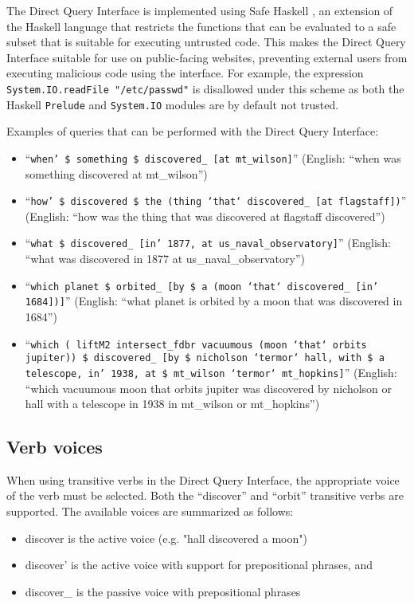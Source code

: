 \documentclass[../main.tex]{subfiles}
\begin{document}
The Direct Query Interface is implemented using Safe Haskell \cite{safehaskell}, an extension of the Haskell language that restricts the functions that can be evaluated
to a safe subset that is suitable for executing untrusted code.  This makes the Direct Query Interface suitable for use on public-facing websites, preventing external users from executing malicious code using the interface.  For example, the expression \texttt{System.IO.readFile "/etc/passwd"} is disallowed under this scheme as both the Haskell \texttt{Prelude} and \texttt{System.IO} modules are by default not trusted.

Examples of queries that can be performed with the Direct Query Interface:
\begin{itemize}
	\item ``\texttt{when' \$ something \$ discovered\_ [at mt\_wilson]}'' (English: ``when was something discovered at mt\_wilson'')
	\item ``\texttt{how' \$ discovered \$ the (thing `that` discovered\_ [at flagstaff])}'' (English: ``how was the thing that was discovered at flagstaff discovered'')
	\item ``\texttt{what \$ discovered\_ [in' 1877, at us\_naval\_observatory]}'' (English: ``what was discovered in 1877 at us\_naval\_observatory'')
	\item ``\texttt{which planet \$ orbited\_ [by \$ a (moon `that` discovered\_ [in' 1684])]}'' (English: ``what planet is orbited by a moon that was discovered in 1684'')
	\item ``\texttt{which ( liftM2 intersect\_fdbr vacuumous  (moon `that` orbits jupiter)) \$ discovered\_ [by \$ nicholson `termor` hall, with \$ a telescope, in' 1938, at \$ mt\_wilson `termor` mt\_hopkins]}'' (English: ``which vacuumous moon that orbits jupiter was discovered by nicholson or hall with a telescope in 1938 in mt\_wilson or mt\_hopkins'')
\end{itemize}

\subsection{Verb voices}

When using transitive verbs in the Direct Query Interface, the appropriate voice of the verb must be selected.  Both the ``discover'' and ``orbit''
transitive verbs are supported.  The available voices are summarized as follows:

\begin{itemize}
	\item discover is the active voice (e.g. "hall discovered a moon")
	\item discover' is the active voice with support for prepositional phrases, and
	\item discover\_ is the passive voice with prepositional phrases
\end{itemize}
\end{document}
